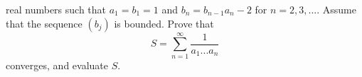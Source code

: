 real numbers such that $a_1 = b_1 = 1$ and $b_n = b_{n-1} a_n - 2$ for
$n=2,3,\dots$. Assume that the sequence $(b_j)$ is bounded. Prove that
\[
S = \sum_{n=1}^\infty \frac{1}{a_1...a_n}
\]
converges, and evaluate $S$.
